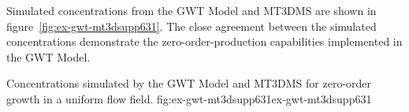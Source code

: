 Simulated concentrations from the \mf GWT Model and MT3DMS are shown in figure~\ref{fig:ex-gwt-mt3dsupp631}.  The close agreement between the simulated concentrations demonstrate the zero-order-production capabilities implemented in the GWT Model.

\begin{StandardFigure}{
                                     Concentrations simulated by the \mf GWT Model and MT3DMS for zero-order growth in a uniform flow field.
                                     }{fig:ex-gwt-mt3dsupp631}{ex-gwt-mt3dsupp631}
\end{StandardFigure}                                 

